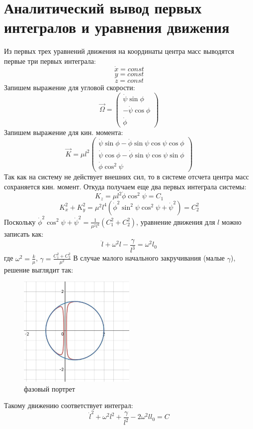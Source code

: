 \documentclass[a4paper, 12pt]{article}
\begin{document}
 \section{Аналитический вывод первых интегралов и уравнения движения}
    Из первых трех уравнений движения на координаты центра масс выводятся первые три первых интеграла:
    \[\dot{x} = const\]
    \[\dot{y} = const\]
    \[\dot{z} = const\]
    Запишем выражение для угловой скорости:
    \[\vec{\Omega} = \begin{pmatrix}
        \dot{\psi}\sin{\phi}\\
        -\dot{\psi}\cos{\phi}\\
        \dot{\phi}
    \end{pmatrix}\]
    Запишем выражение для кин. момента:
    \[\vec{K} = \mu l^2 
    \begin{pmatrix}
        \dot{\psi}\sin{\phi} - \dot{\phi}\sin{\psi}\cos{\psi}\cos{\phi}\\
        \dot{\psi}\cos{\phi} - \dot{\phi}\sin{\psi}\cos{\psi}\sin{\phi}\\
        \dot{\phi}\cos^2{\psi}
    \end{pmatrix}
    \]
    Так как на систему не действует внешних сил, то в системе отсчета центра масс сохраняется кин. момент. Откуда получаем еще два первых интеграла системы:
        \[K_z = \mu l^2 \dot{\phi}\cos^2{\psi} = C_1\]
        \[K_x^2 + K_y^2 = \mu^2 l^4 (\dot{\phi}^2\sin^2{\psi}\cos^2{\psi} + \dot{\psi}^2) = C_2^2\]
    Поскольку $\dot{\phi}^2{\cos^2{\psi}} + \dot{\psi}^2 = \frac{1}{\mu^2 l^4}(C_1^2 + C_2^2)$,
    уравнение движения для $l$ можно записать как:
    \[\ddot{l} + \omega^2 l - \frac{\gamma}{l^3} = \omega^2 l_0\]
    где $\omega^2 = \frac{k}{\mu}$, $\gamma = \frac{C_1^2 + C_2^2}{\mu^2}$
    \newpage
    В случае малого начального закручивания (малые $\gamma$), решение выглядит так:
    \begin{figure}[H]
  \centering
  \includegraphics[width = 0.5\textwidth, height = 0.2\textheight]{pictures/analIT_1.jpg}
  \caption{фазовый портрет}
 \end{figure}
    Такому движению соответствует интеграл:
    \[\dot{l}^2 + \omega^2 l^2 + \frac{\gamma}{l^2} - 2\omega^2 l l_0  = C\]
    
\end{document}
